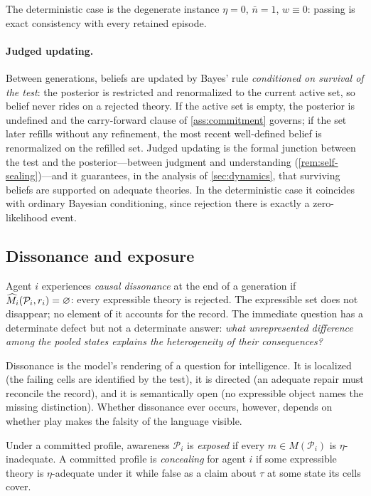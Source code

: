 The deterministic case is the degenerate instance $\eta=0$, $\bar n=1$,
$w\equiv0$: passing is exact consistency with every retained episode.

\paragraph{Judged updating.}
Between generations, beliefs are updated by Bayes' rule \emph{conditioned on
survival of the test}: the posterior is restricted and renormalized to the
current active set, so belief never rides on a rejected theory.  If the
active set is empty, the posterior is undefined and the carry-forward clause
of \cref{ass:commitment} governs; if the set later refills without any
refinement, the most recent well-defined belief is renormalized on the
refilled set.  Judged updating is the formal junction between the test and
the posterior---between judgment and understanding
(\cref{rem:self-sealing})---and it guarantees, in the analysis of
\cref{sec:dynamics}, that surviving beliefs are supported on adequate
theories.  In the deterministic case it coincides with ordinary Bayesian
conditioning, since rejection there is exactly a zero-likelihood event.

\subsection{Dissonance and exposure}

\begin{definition}
\label{def:dissonance}
Agent $i$ experiences \emph{causal dissonance} at the end of a generation if
$\widehat M_i(\mathcal P_i,r_i)=\varnothing$: every expressible theory is
rejected.  The expressible set does not disappear; no element of it accounts
for the record.  The immediate question has a determinate defect but not a
determinate answer: \emph{what unrepresented difference among the pooled
states explains the heterogeneity of their consequences?}
\end{definition}

Dissonance is the model's rendering of a question for intelligence.  It is
localized (the failing cells are identified by the test), it is directed (an
adequate repair must reconcile the record), and it is semantically open (no
expressible object names the missing distinction).  Whether dissonance ever
occurs, however, depends on whether play makes the falsity of the language
visible.

\begin{definition}
\label{def:exposure}
Under a committed profile, awareness $\mathcal P_i$ is \emph{exposed} if
every $m\in M(\mathcal P_i)$ is $\eta$-inadequate.  A committed profile is
\emph{concealing} for agent $i$ if some expressible theory is
$\eta$-adequate under it while false as a claim about $\tau$ at some state
its cells cover.
\end{definition}

